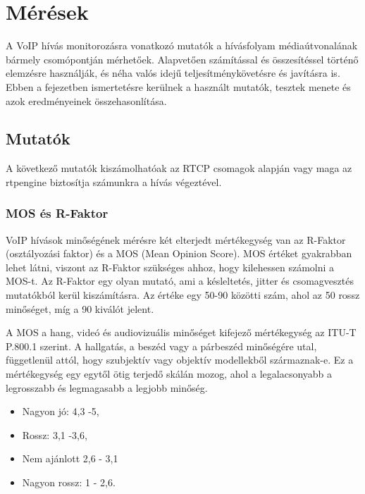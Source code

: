 \chapter{Mérések}

A VoIP hívás monitorozásra vonatkozó mutatók a hívásfolyam médiaútvonalának bármely 
csomópontján mérhetőek. Alapvetően számítással és összesítéssel történő elemzésre 
használják, és néha valós idejű teljesítménykövetésre és javításra is. \\

Ebben a fejezetben ismertetésre kerülnek a használt mutatók, tesztek menete és
azok eredményeinek összehasonlítása.

\section{Mutatók}

A következő mutatók kiszámolhatóak az RTCP csomagok alapján vagy maga az rtpengine
biztosítja számunkra a hívás végeztével.

\subsection{MOS és R-Faktor}

VoIP hívások minőségének mérésre két elterjedt mértékegység van az R-Faktor (osztályozási faktor)
és a MOS (Mean Opinion Score). MOS értéket gyakrabban lehet látni, viszont az R-Faktor szükséges
ahhoz, hogy kilehessen számolni a MOS-t. Az R-Faktor egy olyan mutató, ami a késleltetés, jitter és
csomagvesztés mutatókból kerül kiszámításra. Az értéke egy 50-90 közötti szám, ahol 
az 50 rossz minőséget, míg a 90 kiválót jelent. 

A MOS a hang, videó és audiovizuális minőséget kifejező mértékegység az 
ITU-T P.800.1 szerint. A hallgatás, a beszéd vagy a párbeszéd minőségére utal, 
függetlenül attól, hogy szubjektív vagy objektív modellekből származnak-e. Ez a
mértékegység egy egytől ötig terjedő skálán mozog, ahol a legalacsonyabb a legrosszabb
és legmagasabb a legjobb minőség.

\begin{itemize}
	\item Nagyon jó: 4,3 -5,
	\item Rossz: 3,1 -3,6,
	\item Nem ajánlott 2,6 - 3,1
	\item Nagyon rossz: 1 - 2,6.
\end{itemize}

